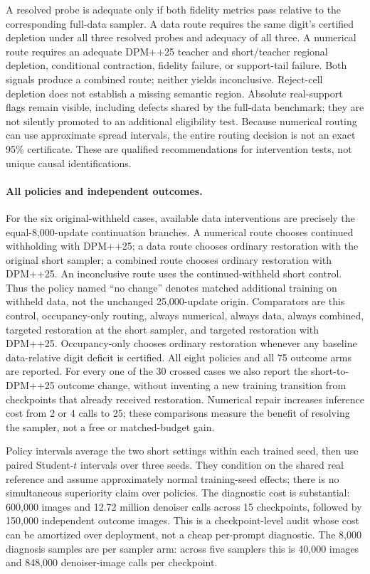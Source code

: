 A resolved probe is adequate only if both fidelity metrics pass relative to
the corresponding full-data sampler. A data route requires the same digit's
certified depletion under all three resolved probes and adequacy of all three.
A numerical route requires an adequate DPM++25 teacher and short/teacher
regional depletion, conditional contraction, fidelity failure, or support-tail
failure. Both signals produce a combined route; neither yields inconclusive.
Reject-cell depletion does not establish a missing semantic region. Absolute
real-support flags remain visible, including defects shared by the full-data
benchmark; they are not silently promoted to an additional eligibility test.
Because numerical routing can use approximate spread intervals, the entire
routing decision is not an exact 95\% certificate. These are qualified
recommendations for intervention tests, not unique causal identifications.

\paragraph{All policies and independent outcomes.}
For the six original-withheld cases, available data interventions are precisely
the equal-8,000-update continuation branches. A numerical route chooses
continued withholding with DPM++25; a data route chooses ordinary restoration
with the original short sampler; a combined route chooses ordinary restoration
with DPM++25. An inconclusive route uses the continued-withheld short control.
Thus the policy named ``no change'' denotes matched additional training on
withheld data, not the unchanged 25,000-update origin. Comparators are this
control, occupancy-only routing, always numerical, always data, always
combined, targeted restoration at the short sampler, and targeted restoration
with DPM++25. Occupancy-only chooses ordinary restoration whenever any baseline
data-relative digit deficit is certified. All eight policies and all 75 outcome
arms are reported. For every one of the 30 crossed cases we also report the
short-to-DPM++25 outcome change, without inventing a new training transition
from checkpoints that already received restoration.
Numerical repair increases inference cost from 2 or 4 calls to 25; these
comparisons measure the benefit of resolving the sampler, not a free or
matched-budget gain.

Policy intervals average the two short settings within each trained seed,
then use paired Student-$t$ intervals over three seeds. They condition on the
shared real reference and assume approximately normal training-seed effects;
there is no simultaneous superiority claim over policies. The diagnostic
cost is substantial: 600,000 images and 12.72 million denoiser calls across
15 checkpoints, followed by 150,000 independent outcome images. This is a
checkpoint-level audit whose cost can be amortized over deployment, not a
cheap per-prompt diagnostic.
The 8,000 diagnosis samples are per sampler arm: across five samplers this is
40,000 images and 848,000 denoiser-image calls per checkpoint.

